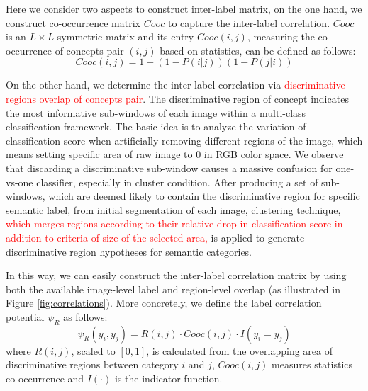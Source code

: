 Here we consider two aspects to construct inter-label matrix, on the one hand, we construct co-occurrence matrix $Cooc$ to capture the inter-label correlation. $Cooc$ is an $L \times L$ symmetric matrix and its entry $Cooc(i,j)$, measuring the co-occurrence of concepts pair $(i,j)$ based on statistics, can be defined as follows:
\begin{equation}
    Cooc(i,j) = 1-(1-P(i|j))(1-P(j|i))
\end{equation}

On the other hand, we determine the inter-label correlation via \textcolor{red}{discriminative regions overlap of concepts pair}. The discriminative region of concept indicates the most informative sub-windows of each image within a multi-class classification framework. The basic idea is to analyze the variation of classification score when artificially removing different regions of the image, which means setting specific area of raw image to 0 in RGB color space. We observe that discarding a discriminative sub-window causes a massive confusion for one-vs-one classifier, especially in cluster condition. After producing a set of sub-windows, which are deemed likely to contain the discriminative region for specific semantic label, from initial segmentation of each image, clustering technique, {\textcolor{red}{which merges regions according to their relative drop in classification score in addition to criteria of size of the selected area,}} is applied to generate discriminative region hypotheses for semantic categories.

In this way, we can easily construct the inter-label correlation matrix by using both the available image-level label and region-level overlap (as illustrated in Figure \ref{fig:correlations}). More concretely, we define the label correlation potential $\psi_R$ as follows:
\begin{equation}
    \psi_{R}(y_i,y_j) = R(i,j) \cdot Cooc(i,j) \cdot I(y_i=y_j)
\end{equation}
where $R(i,j)$, scaled to $[0,1]$, is calculated from the overlapping area of discriminative regions between category $i$ and $j$, $Cooc(i,j)$ measures statistics co-occurrence and $I(\cdot)$ is the indicator function.

